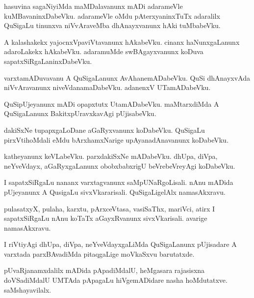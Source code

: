 \documentclass{article}
\begin{document}
\begin{mn}%
hasuvina sagaNiyiMda maMDalavanunx mADi adarameVle kuMBavaninxDabeVku. adarameVle oMdu 
pAterxyaninxTuTx adaralilx QuSigaLu tinunxva niVvAraveMba dhAnayxvanunx hAki tuMbabeVku.
\end{mn}

\begin{mn}%
A kalashakekx yajocnxVpaviVtavanunx hAkabeVku. cinanx haNunxgaLanunx adaroLakekx hAkabeVku. 
adaramuMde swBAgayxvanunx koDuva sapatxSiRgaLaninxDabeVku.
\end{mn}

\begin{mn}%
varxtamADuvavanu A QuSigaLanunx AvAhanemADabeVku. QuSi dhAnayxvAda niVvAravanunx 
niveVdanamaDabeVku. adanenxV UTamADabeVku.
\end{mn}

\begin{mn}%
QuSipUjeyanunx mADi opapxtutx UtamADabeVku. maMtarxdiMda A QuSigaLanunx BakitxpUravxkavAgi 
pUjisabeVku.
\end{mn}

\begin{mn}%
dakiSxNe tupapxgaLoDane aGaRyxvanunx koDabeVku. QuSigaLu pirxVtihoMdali eMdu bArxhamxNarige 
upAyanadAnavanunx koDabeVku.
\end{mn}

\begin{mn}%
katheyanunx keVLabeVku. parxdakiSxNe mADabeVku. dhUpa, diVpa, neYveVdayx, aGaRyxgaLanunx 
obobxbabxrigU beVrebeVreyAgi koDabeVku.
\end{mn}

\begin{mn}%
I sapatxSiRgaLu nananx varxtagvanunx saMpUNaRgoLisali. nAnu mADida pUjeyanunx A QusigaLu 
sivxVkararisali. QuSigaLigelAlx namasAkxravu.
\end{mn}

\begin{mn}%
pulasatxyX, pulaha, karxtu, pArxceVtasa, vasiSaThx, mariVci, atirx I sapatxSiRgaLu nAnu koTaTx 
aGayxRvanunx sivxVkarisali. avarige namasAkxravu.
\end{mn}

\begin{mn}%
I riVtiyAgi dhUpa, diVpa, neYveVdayxgaLiMda QuSigaLanunx pUjisadare A varxtada parxBAvadiMda 
pitaqgaLige moVkaSxvu barutatxde.
\end{mn}

\begin{mn}%
pUvaRjanamxdalilx mADida pApadiMdalU, heMgasara rajasisxna doVSadiMdalU UMTAda pApagaLu 
hiVgemADidare nasha hoMdutatxve. saMshayavilalx.
\end{mn}
\end{document}
